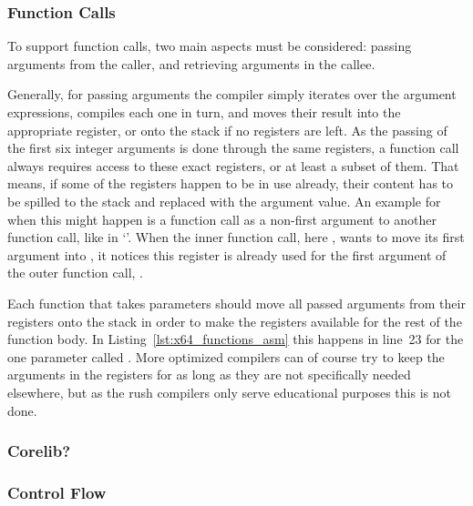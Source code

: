 
\subsubsection{Function Calls}


To support function calls, two main aspects must be considered: passing arguments from the caller, and retrieving arguments in the callee.

Generally, for passing arguments the compiler simply iterates over the argument expressions, compiles each one in turn, and moves their result into the appropriate register, or onto the stack if no registers are left.
As the passing of the first six integer arguments is done through the same registers, a function call always requires access to these exact registers, or at least a subset of them.
That means, if some of the registers happen to be in use already, their content has to be spilled to the stack and replaced with the argument value.
An example for when this might happen is a function call as a non-first argument to another function call, like in `'.
When the inner function call, here , wants to move its first argument  into , it notices this register is already used for the first argument of the outer function call, .

Each function that takes parameters should move all passed arguments from their registers onto the stack in order to make the registers available for the rest of the function body.
In Listing~\ref{lst:x64_functions_asm} this happens in line~23 for the one parameter called .
More optimized compilers can of course try to keep the arguments in the registers for as long as they are not specifically needed elsewhere, but as the rush compilers only serve educational purposes this is not done.

\subsubsection{Corelib?}

\subsubsection{Control Flow}


